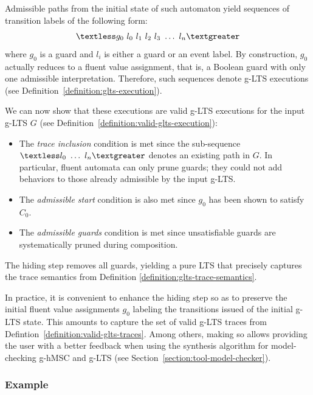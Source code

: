 Admissible paths from the initial state of such automaton yield sequences of transition labels of the following form:
\begin{align*}\textless g_0~l_0~l_1~l_2~l_3~\ldots~l_n \textgreater \end{align*}
where $g_0$ is a guard and $l_i$ is either a guard or an event label. By construction, $g_0$ actually reduces to a fluent value assignment, that is, a Boolean guard with only one admissible interpretation. Therefore, such sequences denote g-LTS executions (see Definition~\ref{definition:glts-execution}).

We can now show that these executions are valid g-LTS executions for the input g-LTS $G$ (see Definition~\ref{definition:valid-glts-execution}):
\begin{itemize}
\item The \emph{trace inclusion} condition is met since the sub-sequence $\textless l_0~\ldots~l_n \textgreater$ denotes an existing path in $G$. In particular, fluent automata can only prune guards; they could not add behaviors to those already admissible by the input g-LTS.
\item The \emph{admissible start} condition is also met since $g_0$ has been shown to satisfy $C_0$.
\item The \emph{admissible guards} condition is met since unsatisfiable guards are systematically pruned during composition.
\end{itemize}

The hiding step removes all guards, yielding a pure LTS that precisely captures the trace semantics from Definition \ref{definition:glts-trace-semantics}. 

In practice, it is convenient to enhance the hiding step so as to preserve the initial fluent value assignments $g_0$ labeling the transitions issued of the initial g-LTS state. This amounts to capture the set of valid g-LTS traces from Defintion~\ref{definition:valid-glts-traces}. Among others, making so allows providing the user with a better feedback when using the synthesis algorithm for model-checking g-hMSC and g-LTS (see Section~\ref{section:tool-model-checker}).

\subsubsection*{Example}


